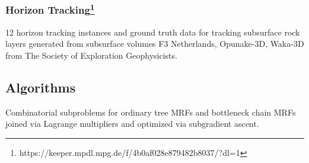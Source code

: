 \subsubsection[Horizon Tracking]{Horizon Tracking\footnote{https://keeper.mpdl.mpg.de/f/4b0af028e879482b8037/?dl=1}}
12 horizon tracking instances and ground truth data for tracking subsurface rock layers generated from subsurface volumes F3 Netherlands, Opunake-3D, Waka-3D from The Society of Exploration Geophysicists.

\subsection{Algorithms}
\begin{description}[style=unboxed]
\item[Lagrange Decomposition \& Subgradient Ascent~\cite{abbas2019bottleneck}:] Combinatorial subproblems for ordinary tree MRFs and bottleneck chain MRFs joined via Lagrange multipliers and optimized via subgradient ascent.
\end{description}

